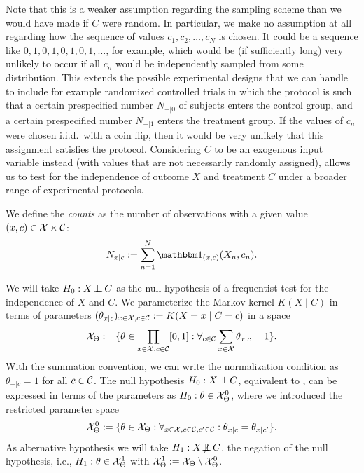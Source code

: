 Note that this is a weaker assumption regarding the sampling scheme than
we would have made if $C$ were random. In particular, we make no assumption
at all regarding how the sequence of values $c_1,c_2,\dots,c_N$ is chosen.
It could be a sequence like $0,1,0,1,0,1,0,1,\dots$, for example, which would
be (if sufficiently long) very unlikely to occur if all $c_n$ would be independently
sampled from some distribution. This extends the possible experimental designs that
we can handle to include for example randomized controlled trials in which the 
protocol is such that a certain prespecified number $N_{+|0}$ of subjects enters the control
group, and a certain prespecified number $N_{+|1}$ enters the treatment group. If the values
of $c_n$ were chosen i.i.d.\ with a coin flip, then it would be very unlikely that
this assignment satisfies the protocol. Considering $C$ to be an exogenous input
variable instead (with values that are not necessarily randomly assigned), allows us to test for the 
independence of outcome $X$ and treatment $C$ under a broader range of experimental
protocols.

We define the \emph{counts} as the number of observations with a given value $(x,c)\in\mathcal{X}\times\mathcal{C}$:
$$N_{x|c} := \sum_{n=1}^N \ind_{(x,c)}(X_n,c_n).$$

We will take $H_0 : X \operatorname*{\perp\mkern-11mu\perp} C$ as the null hypothesis of a frequentist test for the independence of $X$ and $C$.
We parameterize the Markov kernel $K(X \mid C)$ in terms of parameters
$(\theta_{x|c})_{x\in\mathcal{X},c\in\mathcal{C}} := K(X = x \mid C = c)$ in a space
$$\CX_\Theta := %
\{ \theta \in \prod_{x\in\C{X},c\in\C{C}} [0,1] : \forall_{c\in\C{C}} \sum_{x\in\C{X}} \theta_{x|c} = 1\}.$$
With the summation convention, we can write the normalization condition as $\theta_{+|c} = 1$ for all $c \in \mathcal{C}$.
The null hypothesis $H_0 : X \operatorname*{\perp\mkern-11mu\perp} C$, equivalent to , can be expressed
in terms of the parameters as $H_0 : \theta \in \mathcal{X}_\Theta^0$, where we introduced the restricted parameter space
$$\mathcal{X}_\Theta^0 := \{ \theta \in \mathcal{X}_\Theta : \forall_{x\in\mathcal{X},c\in\mathcal{C},c'\in\mathcal{C}}: \theta_{x|c} = \theta_{x|c'} \}.$$
As alternative hypothesis we will take $H_1 : X \operatorname*{\not\mkern-2mu\perp\mkern-11mu\perp} C$, the negation of the null hypothesis, i.e.,
$H_1 : \theta \in \mathcal{X}_\Theta^1$ with $\mathcal{X}_\Theta^1 := \mathcal{X}_\Theta \setminus \mathcal{X}_\Theta^0$.

